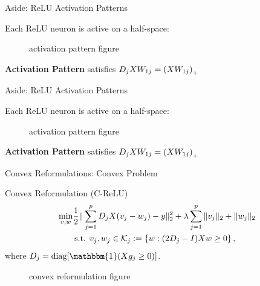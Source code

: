 \documentclass[usenames,dvipsnames,mathserif,notheorems]{beamer}
\newcommand{\good}[1]{\textcolor{good}{#1}}
\def\showtikz{}
\begin{document}
\begin{frame}{Aside: ReLU Activation Patterns}

	Each ReLU neuron is active on a half-space:

	\begin{figure}[]
		\centering
		\ifdefined\showtikz
			
		\else
			\Huge activation pattern figure
		\fi
	\end{figure}

	\pause
	\textbf{Activation Pattern} satisfies \( D_j X W_{1j} = \left(X W_{1j}\right)_+ \)

\end{frame}

\begin{frame}{Aside: ReLU Activation Patterns}

	Each ReLU neuron is active on a half-space:

	\begin{figure}[]
		\centering
		\ifdefined\showtikz
			
		\else
			\Huge activation pattern figure
		\fi
	\end{figure}


	\textbf{Activation Pattern} satisfies \( D_j X W_{1j} = \left(X W_{1j}\right)_+ \)

\end{frame}


\begin{frame}{Convex Reformulations: Convex Problem}

	{\large \good{Convex Reformulation} (C-ReLU)} \citep{pilanci2020convex}
	\[
		\begin{aligned}
			\min_{v, w} & \frac 1 2 \|\sum_{j=1}^p D_j X (v_j - w_j) - y\|_2^2 +
			\lambda \sum_{j=1}^p \|v_j\|_2 + \|w_j\|_2                    \\
			            & \hspace{0.2em} \text{s.t. }
			v_j, w_j \in \mathcal{K}_j := \left\{w : (2D_j - I) X w \geq 0\right\},
		\end{aligned}
	\]
	where \( D_j = \text{diag}[\mathbbm{1}(X g_j \geq 0)] \).
	\pause

	\begin{figure}[]
		\centering
		\ifdefined\showtikz
			
		\else
			\Huge convex reformulation figure
		\fi
	\end{figure}
\end{frame}
\end{document}

